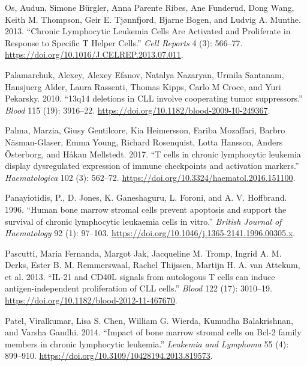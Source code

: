 \documentclass[11pt, a4paper, twosided]{book}
\newenvironment{CSLReferences}%
  {}%
  {\par}
\begin{document}
\begin{CSLReferences}{1}{0}
\leavevmode{}%
Os, Audun, Simone Bürgler, Anna Parente Ribes, Ane Funderud, Dong Wang, Keith M. Thompson, Geir E. Tjønnfjord, Bjarne Bogen, and Ludvig A. Munthe. 2013. {``{Chronic Lymphocytic Leukemia Cells Are Activated and Proliferate in Response to Specific T Helper Cells}.''} \emph{Cell Reports} 4 (3): 566--77. \url{https://doi.org/10.1016/J.CELREP.2013.07.011}.

\leavevmode{}%
Palamarchuk, Alexey, Alexey Efanov, Natalya Nazaryan, Urmila Santanam, Hansjuerg Alder, Laura Rassenti, Thomas Kipps, Carlo M Croce, and Yuri Pekarsky. 2010. {``{13q14 deletions in CLL involve cooperating tumor suppressors}.''} \emph{Blood} 115 (19): 3916--22. \url{https://doi.org/10.1182/blood-2009-10-249367}.

\leavevmode{}%
Palma, Marzia, Giusy Gentilcore, Kia Heimersson, Fariba Mozaffari, Barbro Näsman-Glaser, Emma Young, Richard Rosenquist, Lotta Hansson, Anders Österborg, and Håkan Mellstedt. 2017. {``{T cells in chronic lymphocytic leukemia display dysregulated expression of immune checkpoints and activation markers}.''} \emph{Haematologica} 102 (3): 562--72. \url{https://doi.org/10.3324/haematol.2016.151100}.

\leavevmode{}%
Panayiotidis, P., D. Jones, K. Ganeshaguru, L. Foroni, and A. V. Hoffbrand. 1996. {``{Human bone marrow stromal cells prevent apoptosis and support the survival of chronic lymphocytic leukaemia cells in vitro}.''} \emph{British Journal of Haematology} 92 (1): 97--103. \url{https://doi.org/10.1046/j.1365-2141.1996.00305.x}.

\leavevmode{}%
Pascutti, Maria Fernanda, Margot Jak, Jacqueline M. Tromp, Ingrid A. M. Derks, Ester B. M. Remmerswaal, Rachel Thijssen, Martijn H. A. van Attekum, et al. 2013. {``{IL-21 and CD40L signals from autologous T cells can induce antigen-independent proliferation of CLL cells}.''} \emph{Blood} 122 (17): 3010--19. \url{https://doi.org/10.1182/blood-2012-11-467670}.

\leavevmode{}%
Patel, Viralkumar, Lisa S. Chen, William G. Wierda, Kumudha Balakrishnan, and Varsha Gandhi. 2014. {``{Impact of bone marrow stromal cells on Bcl-2 family members in chronic lymphocytic leukemia}.''} \emph{Leukemia and Lymphoma} 55 (4): 899--910. \url{https://doi.org/10.3109/10428194.2013.819573}.


\end{CSLReferences}
\end{document}
